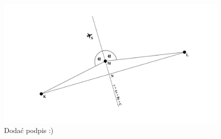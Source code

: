 \documentclass[12pt, a4paper]{article}
\begin{document}
 \begin{figure}[ht]
    \centering
    \includegraphics[width=1\textwidth]{nextwaypoint}
    \caption{Dodać podpis :)}
\end{figure}
\end{document}
